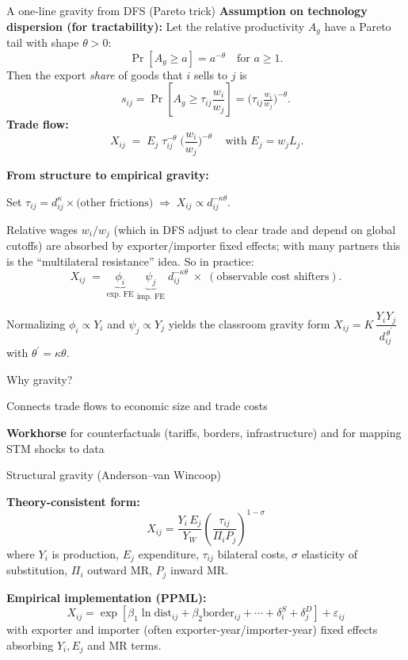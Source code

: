 \documentclass[notes,11pt, aspectratio=169, xcolor=table]{beamer}
\newenvironment{wideitemize}{\itemize\addtolength{\itemsep}{10pt}}{\enditemize}
\begin{document}
\begin{frame}{A one-line gravity from DFS (Pareto trick)}
\small
\textbf{Assumption on technology dispersion (for tractability):}
Let the relative productivity $A_g$ have a Pareto tail with shape $\theta>0$:
\[
\Pr[A_g \ge a] = a^{-\theta}\quad \text{for } a\ge 1.
\]
Then the export \emph{share} of goods that $i$ sells to $j$ is
\[
s_{ij}=\Pr\!\left[A_g \ge \tau_{ij}\frac{w_i}{w_j}\right]
= \big(\tau_{ij}\tfrac{w_i}{w_j}\big)^{-\theta}.
\]
\textbf{Trade flow:}
\[
\boxed{\,X_{ij} \;=\; E_j\;\tau_{ij}^{-\theta}\;\Big(\frac{w_i}{w_j}\Big)^{-\theta}\,}
\quad\text{with } E_j=w_j L_j.
\]

\textbf{From structure to empirical gravity:}
\begin{wideitemize}
  \item Set $\tau_{ij}=d_{ij}^{\kappa}\times\text{(other frictions)} \;\Rightarrow\; X_{ij}\propto d_{ij}^{-\kappa\theta}$. 
  \item Relative wages $w_i/w_j$ (which in DFS adjust to clear trade and depend on global cutoffs) are absorbed by exporter/importer fixed effects; with many partners this is the “multilateral resistance” idea. So in practice:
  \[
  X_{ij} \;=\; \underbrace{\phi_i}_{\text{exp.\ FE}} \;\underbrace{\psi_j}_{\text{imp.\ FE}}\; d_{ij}^{-\kappa\theta}\;\times\;(\text{observable cost shifters}) .
  \]
  \item Normalizing $\phi_i\propto Y_i$ and $\psi_j\propto Y_j$ yields the classroom gravity form 
  $X_{ij}=K\,\dfrac{Y_i Y_j}{d_{ij}^{\,\theta^\prime}}$ with $\theta^\prime=\kappa\theta$.
\end{wideitemize}

\end{frame}

\begin{frame}{Why gravity?}
\begin{wideitemize}
  \item Connects trade flows to economic size and trade costs
  \item \textbf{Workhorse} for counterfactuals (tariffs, borders, infrastructure) and for mapping STM shocks to data
\end{wideitemize}
\end{frame}

\begin{frame}{Structural gravity (Anderson–van Wincoop)}
\begin{wideitemize}
  \item \textbf{Theory-consistent form:}
  \[
   X_{ij}=\frac{Y_i\,E_j}{Y_W}\left(\frac{\tau_{ij}}{\Pi_i P_j}\right)^{1-\sigma}
  \]
  where $Y_i$ is production, $E_j$ expenditure, $\tau_{ij}$ bilateral costs, $\sigma$ elasticity of substitution,
  $\Pi_i$ outward MR, $P_j$ inward MR.
  \item \textbf{Empirical implementation (PPML):}
  \[
   X_{ij}=\exp\!\left[\beta_1\ln \text{dist}_{ij}+\beta_2\text{border}_{ij}+\cdots
   + \delta^{S}_{i} + \delta^{D}_{j}\right]+\varepsilon_{ij}
  \]
  with exporter and importer (often exporter-year/importer-year) fixed effects absorbing $Y_i, E_j$ and MR terms.
\end{wideitemize}
\end{frame}
\end{document}
